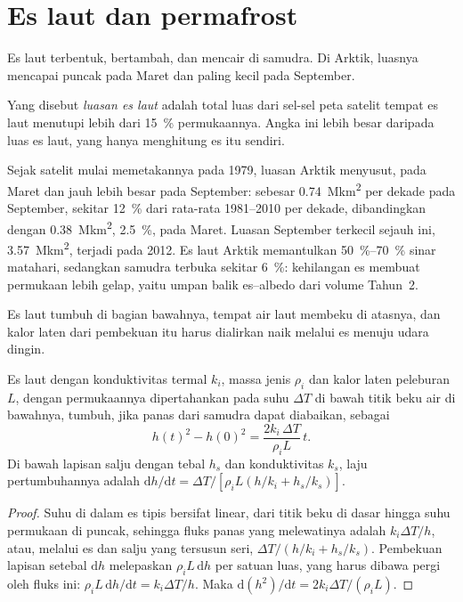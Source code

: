 \section{Es laut dan permafrost}\label{sec:b3:glaciology:sea-ice}

Es laut terbentuk, bertambah, dan mencair di samudra. Di Arktik, luasnya
mencapai puncak pada Maret dan paling kecil pada September.

\begin{definition}\label{def:b3:glaciology:sea-ice}
Yang disebut \emph{luasan es laut} adalah total luas dari
sel-sel peta satelit tempat es laut menutupi lebih dari
\qty{15}{\percent} permukaannya. Angka ini lebih besar daripada luas es laut,
yang hanya menghitung es itu sendiri.
\end{definition}

Sejak satelit mulai memetakannya pada 1979, luasan Arktik menyusut, pada
Maret dan jauh lebih besar pada September: sebesar \qty{0.74}{\mega km^2} per dekade
pada September, sekitar \qty{12}{\percent} dari rata-rata 1981--2010 per dekade, dibandingkan
dengan \qty{0.38}{\mega km^2}, \qty{2.5}{\percent}, pada Maret. Luasan September
terkecil sejauh ini, \qty{3.57}{\mega km^2}, terjadi pada 2012. Es laut Arktik
memantulkan \qtyrange{50}{70}{\percent} sinar matahari, sedangkan samudra terbuka
sekitar \qty{6}{\percent}: kehilangan es membuat permukaan lebih gelap, yaitu
umpan balik es--albedo dari volume Tahun~2.

Es laut tumbuh di bagian bawahnya, tempat air laut membeku di atasnya, dan kalor
laten dari pembekuan itu harus dialirkan naik melalui es menuju udara dingin.

\begin{theorem}\label{thm:b3:glaciology:stefan}
Es laut dengan konduktivitas termal $k_i$, massa jenis $\rho_i$ dan kalor laten
peleburan $L$, dengan permukaannya dipertahankan pada suhu $\Delta T$ di bawah
titik beku air di bawahnya, tumbuh, jika panas dari samudra
dapat diabaikan, sebagai
\[
h(t)^2 - h(0)^2 = \frac{2k_i\,\Delta T}{\rho_iL}\,t .
\]
Di bawah lapisan salju dengan tebal $h_s$ dan konduktivitas $k_s$, laju
pertumbuhannya adalah $\mathrm dh/\mathrm dt = \Delta T/[\rho_iL(h/k_i + h_s/k_s)]$.
\end{theorem}

\begin{proof}
Suhu di dalam es tipis bersifat linear, dari titik beku di dasar
hingga suhu permukaan di puncak, sehingga fluks panas yang melewatinya adalah
$k_i\Delta T/h$, atau, melalui es dan salju yang tersusun seri, $\Delta T/(h/k_i +
h_s/k_s)$. Pembekuan lapisan setebal $\mathrm dh$ melepaskan $\rho_iL\,\mathrm dh$ per
satuan luas, yang harus dibawa pergi oleh fluks ini: $\rho_iL\,\mathrm dh/\mathrm dt
= k_i\Delta T/h$. Maka $\mathrm d(h^2)/\mathrm dt = 2k_i\Delta T/(\rho_iL)$.
\end{proof}

